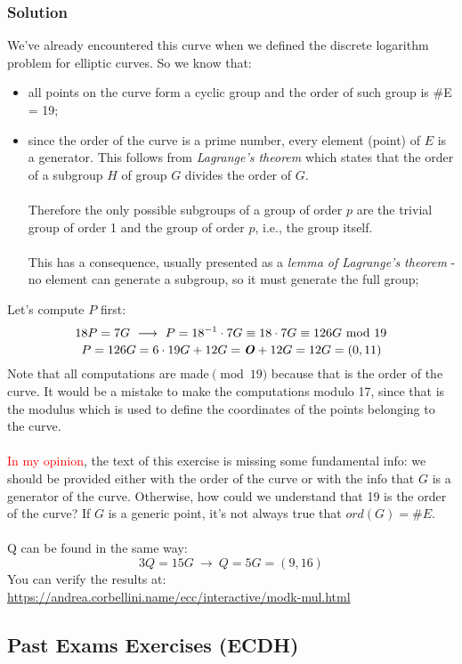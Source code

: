 \subsubsection*{Solution}
We've already encountered this curve when we defined the discrete logarithm problem for elliptic curves. So we know that:
\begin{itemize}
    \item all points on the curve form a cyclic group and the order of such group is \#E = 19;
    \item since the order of the curve is a prime number, every element (point) of $E$ is a generator. This follows from \textit{Lagrange's theorem} which states that the order of a subgroup $H$ of group $G$ divides the order of $G$.\\\\
    Therefore the only possible subgroups of a group of order $p$ are the trivial group of order 1 and the group of order $p$, i.e., the group itself.\\\\
    This has a consequence, usually presented as a \textit{lemma of Lagrange's theorem} - no element can generate a subgroup, so it must generate the full group;
\end{itemize}
Let's compute $P$ first:
$$18P=7G\ \longrightarrow\ P=18^{-1}\cdot7G\equiv18\cdot7G\equiv126G\mymod19$$
$$P=126G=6\cdot19G+12G=\text{\textbf{\textit{O}}}+12G=12G=(0,11)$$
Note that all computations are made$\pmod{19}$ because that is the order of the curve. It would be a mistake to make the computations modulo 17, since that is the modulus which is used to define the coordinates of the points belonging to the curve.\\\\
\textcolor{red}{In my opinion}, the text of this exercise is missing some fundamental info: we should be provided either with the order of the curve or with the info that $G$ is a generator of the curve. Otherwise, how could we understand that 19 is the order of the curve? If $G$ is a generic point, it's not always true that $ord(G)=\#E$.\\\\
Q can be found in the same way:
$$3Q=15G\ \longrightarrow\ Q=5G=(9,16)$$
You can verify the results at: \textcolor{blue}{\url{https://andrea.corbellini.name/ecc/interactive/modk-mul.html}}

\newpage
\subsection{Past Exams Exercises (ECDH)}
